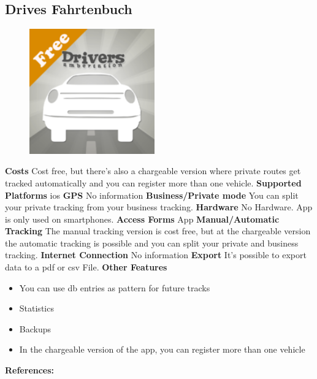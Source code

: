 \begin{singlespace}
\section{Drives Fahrtenbuch}
\begin{figure}
  \begin{center}
    \includegraphics[width=0.48\textwidth]{bilder/drives}
  \end{center}
\end{figure}
\textbf{Costs} Cost free, but there's also a chargeable version where private routes get tracked automatically and you can register more than one vehicle.
\newline\newline
\textbf{Supported Platforms} \gls{ios}
\newline\newline
\textbf{GPS} No information
\newline\newline
\textbf{Business/Private mode} You can split your private tracking from your business tracking.
\newline\newline
\textbf{Hardware} No Hardware. App is only used on smartphones.
\newline\newline
\textbf{Access Forms} App
\newline\newline
\textbf{Manual/Automatic Tracking} The manual tracking version is cost free, but at the chargeable version the automatic tracking is possible and you can split your private and business tracking.
\newline\newline
\textbf{Internet Connection} No information
\newline\newline
\textbf{Export} It’s possible to export data to a \gls{pdf} or \gls{csv} File.
\newline\newline
\textbf{Other Features} 
\begin{itemize}
\item You can use \gls{db} entries as pattern for future tracks
\item Statistics
\item Backups
\item In the chargeable version of the app, you can register more than one vehicle
\end{itemize}
\textbf{References:} \cite{Drives_Fahrtenbuch}
\newpage


\end{singlespace}
